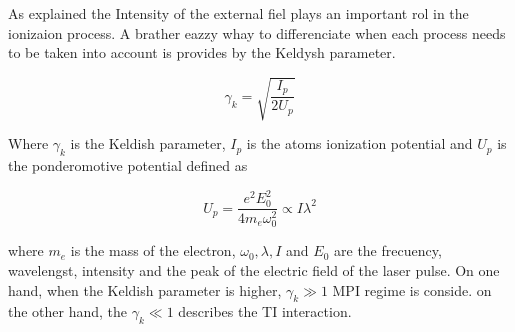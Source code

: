 As explained the Intensity of the external fiel plays an important rol in the ionizaion process. A brather eazzy whay to differenciate when each process needs to be taken into account is provides by the Keldysh parameter\cite{keldysh_ionization_1965}.

\begin{equation}
\gamma_{k}=\sqrt{\dfrac{I_{p}}{2U_{p}}}
\end{equation}

Where $\gamma_{k}$ is the Keldish parameter, $I_{p}$ is the atoms ionization potential and $U_{p}$ is the ponderomotive potential defined as

\begin{equation}
U_{p} = \dfrac{e^{2}E_{0}^{2}}{4m_{e}\omega_{0}^{2}} \propto I \lambda^{2}
\end{equation}

where $m_{e}$ is the mass of the electron, $\omega_{0}, \lambda, I$ and $E_{0}$ are the frecuency, wavelengst, intensity and the peak of the electric field of the laser pulse. On one hand, when the Keldish parameter is higher, $\gamma_{k} \gg 1$ MPI regime is conside. on the other hand, the $\gamma_{k} \ll 1$ describes the TI interaction.








